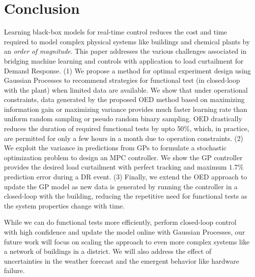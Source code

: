 \section{Conclusion}

Learning black-box models for real-time control reduces the cost and time required to model complex physical systems like buildings and chemical plants by an \textit{order of magnitude}.
This paper addresses the various challenges associated in bridging machine learning and controls with application to load curtailment for Demand Response.
(1) We propose a method for optimal experiment design using Gaussian Processes to recommend strategies for functional test (in closed-loop with the plant) when limited data are available. 
We show that under operational constraints, data generated by the proposed OED method based on maximizing information gain or maximizing variance provides much faster learning rate than uniform random sampling or pseudo random binary sampling. 
OED drastically reduces the duration of required functional tests by upto \(50\%\), which, in practice, are permitted for only a few hours in a month due to operation constraints.
(2) We exploit the variance in predictions from GPs to formulate a stochastic optimization problem to design an MPC controller.
We show the GP controller provides the desired load curtailment with perfect tracking and maximum \(1.7\%\) prediction error during a DR event. 
(3) Finally, we extend the OED approach to update the GP model as new data is generated by running the controller in a closed-loop with the building, reducing the repetitive need for functional tests as the system properties change with time.

While we can do functional tests more efficiently, perform closed-loop control with high confidence and update the model online with Gaussian Processes, our future work will focus on scaling the approach to even more complex systems like a network of buildings in a district. 
We will also address the effect of uncertainties in the weather forecast and the emergent behavior like hardware failure.
